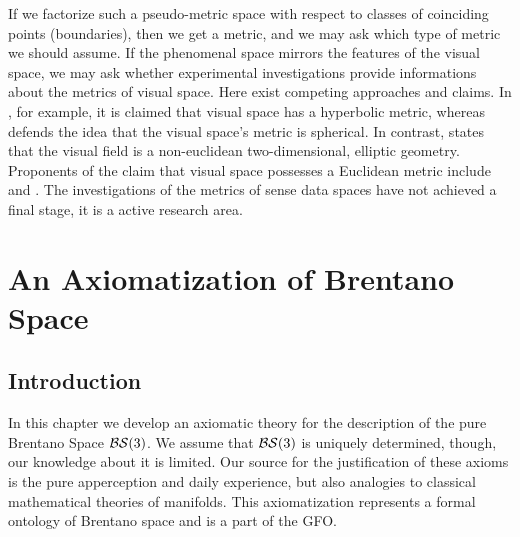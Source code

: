 \documentclass{ao2e}
\begin{document}
{If we factorize such a pseudo-metric space with respect to classes of coinciding points (boundaries), then we get a metric, and we may ask which type of metric we should assume. If the phenomenal space mirrors the features of the visual space, we may ask whether experimental investigations provide informations about the metrics of visual space. Here exist competing approaches and claims. In \cite{luneburg-r-1950-a}, for example, it is claimed that visual space has a hyperbolic metric, whereas \cite{french-r-1987-a} defends the idea that the visual space's metric 
is spherical. In contrast, \cite{angell-rb-1974-a} states that the visual field is a non-euclidean two-dimensional, elliptic geometry. Proponents of the claim that visual space possesses a Euclidean metric include \cite{kant-i-1998-a} and \cite{strawson-pf-1966-a}. The investigations of the metrics of sense data spaces have not achieved a final stage, it is a active research area.   
 
  




\section{An Axiomatization of Brentano Space}  
\subsection{Introduction}
In this chapter we develop an axiomatic theory for the description of the pure Brentano Space ${\cal B S} (3)$.
We assume that ${\cal B S} (3)$ is uniquely determined, though, our knowledge about it is limited. Our source for the justification of these axioms is the pure apperception and daily experience, but also analogies to
classical mathematical theories of manifolds. This axiomatization represents a formal ontology of Brentano space and is a part of the GFO.

}
\end{document}
